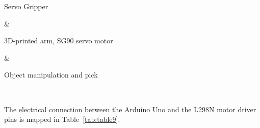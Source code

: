 \documentclass[12pt,a4paper,oneside]{report}
\begin{document}
\begin{longtable}[]
\begin{minipage}[b]{\linewidth}
Servo Gripper

\end{minipage} & \begin{minipage}[b]{\linewidth}\raggedright

3D-printed arm, SG90 servo motor

\end{minipage} & \begin{minipage}[b]{\linewidth}\raggedright

Object manipulation and pick

\end{minipage} \\
\midrule\noalign{}
\endhead
\bottomrule\noalign{}
\endlastfoot
\end{longtable}

The electrical connection between the Arduino Uno and the L298N motor
driver pins is mapped in Table~\ref{tab:table9}.
\end{document}
